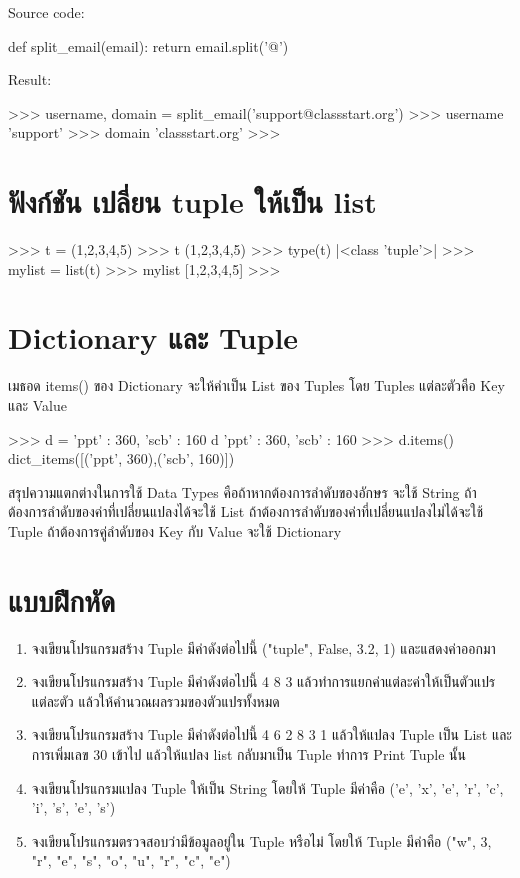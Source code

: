 Source code:
\begin{pycode}
def split_email(email):
    return email.split('@')
\end{pycode}

Result:
\begin{pycode}
>>> username, domain = split_email('support@classstart.org')
>>> username
'support'
>>> domain
'classstart.org'
>>>
\end{pycode}

\section{ฟังก์ชัน  เปลี่ยน tuple ให้เป็น list}

\begin{pycode}
>>> t = (1,2,3,4,5)
>>> t
(1,2,3,4,5)
>>> type(t)
|<class \rq{}tuple\rq{}>|
>>> mylist = list(t)
>>> mylist
[1,2,3,4,5]
>>>
\end{pycode}


\section{Dictionary และ Tuple}

เมธอด items() ของ Dictionary จะให้ค่าเป็น List  ของ Tuples โดย Tuples แต่ละตัวคือ Key และ Value 

\begin{pycode}
>>> d = {'ppt' : 360, 'scb' : 160}
d
{'ppt' : 360, 'scb' : 160}
>>> d.items()
dict_items([('ppt', 360),('scb', 160)])
\end{pycode}


สรุปความแตกต่างในการใช้ Data Types คือถ้าหากต้องการลำดับของอักษร จะใช้ String ถ้าต้องการลำดับของค่าที่เปลี่ยนแปลงได้จะใช้ List ถ้าต้องการลำดับของค่าที่เปลี่ยนแปลงไม่ได้จะใช้ Tuple ถ้าต้องการคู่ลำดับของ Key กับ Value จะใช้ Dictionary

\section{แบบฝึกหัด}
\begin{enumerate} 
\item 	จงเขียนโปรแกรมสร้าง Tuple มีค่าดังต่อไปนี้ ("tuple", False, 3.2, 1) และแสดงค่าออกมา
\item 	จงเขียนโปรแกรมสร้าง Tuple มีค่าดังต่อไปนี้ 4 8 3 แล้วทำการแยกค่าแต่ละค่าให้เป็นตัวแปรแต่ละตัว แล้วให้คำนวณผลรวมของตัวแปรทั้งหมด
\item 	จงเขียนโปรแกรมสร้าง Tuple มีค่าดังต่อไปนี้ 4 6 2 8 3 1 แล้วให้แปลง Tuple เป็น List และการเพิ่มเลข 30 เข้าไป แล้วให้แปลง list กลับมาเป็น Tuple ทำการ Print Tuple นั้น
\item 	จงเขียนโปรแกรมแปลง Tuple ให้เป็น String โดยให้ Tuple มีค่าคือ ('e', 'x', 'e', 'r', 'c', 'i', 's', 'e', 's')
\item 	จงเขียนโปรแกรมตรวจสอบว่ามีข้อมูลอยู่ใน Tuple หรือไม่ โดยให้ Tuple มีค่าคือ ("w", 3, "r", "e", "s", "o", "u", "r", "c", "e")
\end{enumerate}